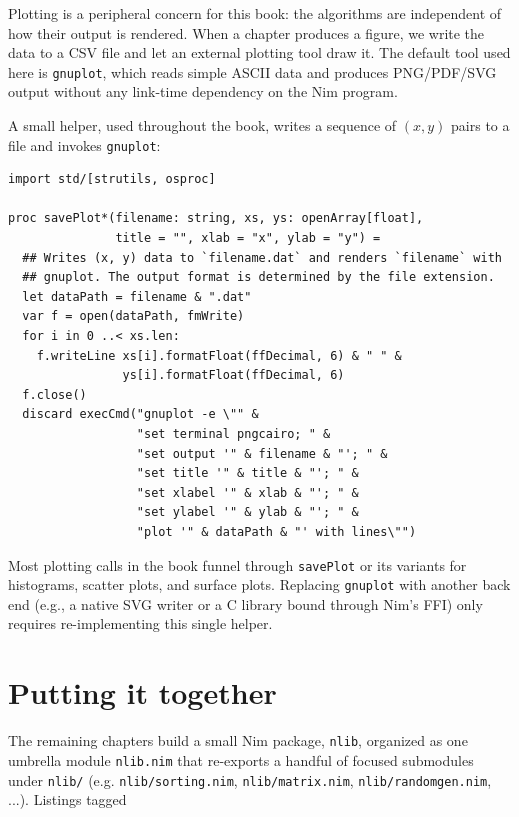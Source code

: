 \documentclass[justified, sixbynine]{tufte-book}
\def\ft{\small\tt}
\theoremstyle{plain}%
\newtheorem * {corollary}{Corollary}
\theoremstyle{definition}
\theoremstyle{remark}
\newtheorem * {remark}{Remark}
\newtheorem * {note}{Note}
\begin{document}
\begin{fullwidth}

Plotting is a peripheral concern for this book: the algorithms are independent of how their output is rendered. When a chapter produces a figure, we write the data to a CSV file and let an external plotting tool draw it. The default tool used here is {\ft gnuplot}, which reads simple ASCII data and produces PNG/PDF/SVG output without any link-time dependency on the Nim program.

A small helper, used throughout the book, writes a sequence of $(x, y)$ pairs to a file and invokes {\ft gnuplot}:

\begin{lstlisting}[caption={in file: {\ft nlib/plotting.nim}}]
import std/[strutils, osproc]

proc savePlot*(filename: string, xs, ys: openArray[float],
               title = "", xlab = "x", ylab = "y") =
  ## Writes (x, y) data to `filename.dat` and renders `filename` with
  ## gnuplot. The output format is determined by the file extension.
  let dataPath = filename & ".dat"
  var f = open(dataPath, fmWrite)
  for i in 0 ..< xs.len:
    f.writeLine xs[i].formatFloat(ffDecimal, 6) & " " &
                ys[i].formatFloat(ffDecimal, 6)
  f.close()
  discard execCmd("gnuplot -e \"" &
                  "set terminal pngcairo; " &
                  "set output '" & filename & "'; " &
                  "set title '" & title & "'; " &
                  "set xlabel '" & xlab & "'; " &
                  "set ylabel '" & ylab & "'; " &
                  "plot '" & dataPath & "' with lines\"")
\end{lstlisting}

Most plotting calls in the book funnel through {\ft savePlot} or its variants for histograms, scatter plots, and surface plots. Replacing {\ft gnuplot} with another back end (e.g., a native SVG writer or a C library bound through Nim's FFI) only requires re-implementing this single helper.

\goodbreak\section{Putting it together}

The remaining chapters build a small Nim package, {\ft nlib}, organized as one umbrella module {\ft nlib.nim} that re-exports a handful of focused submodules under {\ft nlib/} (e.g. {\ft nlib/sorting.nim}, {\ft nlib/matrix.nim}, {\ft nlib/randomgen.nim}, ...). Listings tagged


\end{fullwidth}
\end{document}
